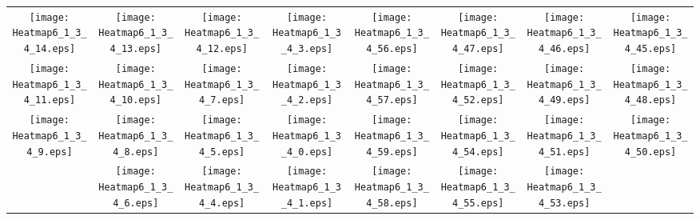 \documentclass{standalone}
\begin{document}
\begin{tabular}{ *8{c} }
\texttt{[image: Heatmap6\_1\_3\_4\_14.eps]} & \texttt{[image: Heatmap6\_1\_3\_4\_13.eps]} & \texttt{[image: Heatmap6\_1\_3\_4\_12.eps]} & \texttt{[image: Heatmap6\_1\_3\_4\_3.eps]} & \texttt{[image: Heatmap6\_1\_3\_4\_56.eps]} & \texttt{[image: Heatmap6\_1\_3\_4\_47.eps]} & \texttt{[image: Heatmap6\_1\_3\_4\_46.eps]} & \texttt{[image: Heatmap6\_1\_3\_4\_45.eps]} \\
\texttt{[image: Heatmap6\_1\_3\_4\_11.eps]} & \texttt{[image: Heatmap6\_1\_3\_4\_10.eps]} & \texttt{[image: Heatmap6\_1\_3\_4\_7.eps]} & \texttt{[image: Heatmap6\_1\_3\_4\_2.eps]} & \texttt{[image: Heatmap6\_1\_3\_4\_57.eps]} & \texttt{[image: Heatmap6\_1\_3\_4\_52.eps]} & \texttt{[image: Heatmap6\_1\_3\_4\_49.eps]} & \texttt{[image: Heatmap6\_1\_3\_4\_48.eps]} \\
\texttt{[image: Heatmap6\_1\_3\_4\_9.eps]} & \texttt{[image: Heatmap6\_1\_3\_4\_8.eps]} & \texttt{[image: Heatmap6\_1\_3\_4\_5.eps]} & \texttt{[image: Heatmap6\_1\_3\_4\_0.eps]} & \texttt{[image: Heatmap6\_1\_3\_4\_59.eps]} & \texttt{[image: Heatmap6\_1\_3\_4\_54.eps]} & \texttt{[image: Heatmap6\_1\_3\_4\_51.eps]} & \texttt{[image: Heatmap6\_1\_3\_4\_50.eps]} \\
 & \texttt{[image: Heatmap6\_1\_3\_4\_6.eps]} & \texttt{[image: Heatmap6\_1\_3\_4\_4.eps]} & \texttt{[image: Heatmap6\_1\_3\_4\_1.eps]} & \texttt{[image: Heatmap6\_1\_3\_4\_58.eps]} & \texttt{[image: Heatmap6\_1\_3\_4\_55.eps]} & \texttt{[image: Heatmap6\_1\_3\_4\_53.eps]} &  
\end{tabular}
\end{document}

